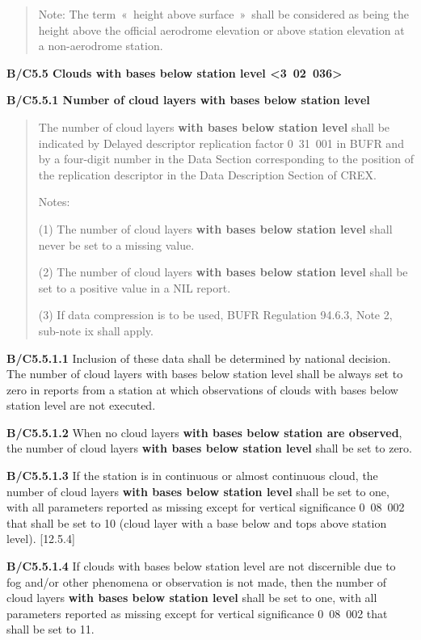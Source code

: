 \begin{quote}
Note: The term~«~height above surface~»~shall be considered as being the height above the official aerodrome elevation or above station elevation at a non-aerodrome station.
\end{quote}

\textbf{B/C5.5 Clouds with bases below station level \textless3~02~036\textgreater{}}

\textbf{B/C5.5.1 Number of cloud layers with bases below station level}

\begin{quote}
The number of cloud layers \textbf{with bases below station level} shall be indicated by Delayed descriptor replication factor 0~31~001 in BUFR and by a four-digit number in the Data Section corresponding to the position of the replication descriptor in the Data Description Section of CREX.

Notes:

(1) The number of cloud layers \textbf{with bases below station level} shall never be set to a missing value.

(2) The number of cloud layers \textbf{with bases below station level} shall be set to a positive value in a NIL report.

(3) If data compression is to be used, BUFR Regulation 94.6.3, Note 2, sub-note ix shall apply.
\end{quote}

\textbf{B/C5.5.1.1} Inclusion of these data shall be determined by national decision. The number of cloud layers with bases below station level shall be always set to zero in reports from a station at which observations of clouds with bases below station level are not executed.

\textbf{B/C5.5.1.2} When no cloud layers \textbf{with bases below station are observed}, the number of cloud layers \textbf{with bases below station level} shall be set to zero.

\textbf{B/C5.5.1.3} If the station is in continuous or almost continuous cloud, the number of cloud layers \textbf{with bases below station level} shall be set to one, with all parameters reported as missing except for vertical significance 0~08~002 that shall be set to 10 (cloud layer with a base below and tops above station level). {[}12.5.4{]}

\textbf{B/C5.5.1.4} If clouds with bases below station level are not discernible due to fog and/or other phenomena or observation is not made, then the number of cloud layers \textbf{with bases below station level} shall be set to one, with all parameters reported as missing except for vertical significance 0~08~002 that shall be set to 11.

